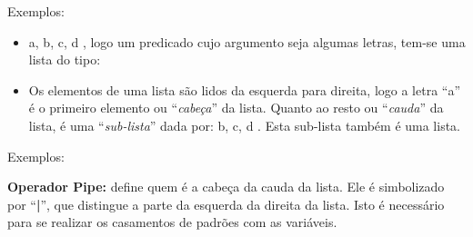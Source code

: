 \documentclass[sans]{beamer}
\begin{document}

\begin{frame}
\begin{block}{Exemplos:}

\begin{itemize}
  \item \lbrack a, b, c, d \rbrack,  logo um predicado cujo
argumento seja algumas letras,  tem-se uma lista do tipo:
\end{itemize}



\begin{itemize}
\item Os elementos de uma lista são lidos da esquerda para direita, logo a letra
``a'' é o primeiro elemento ou ``{\em cabeça}'' da lista. Quanto ao
resto ou ``{\em cauda}'' da lista, é uma   ``{\em sub-lista}''  dada por:
\lbrack b,  c, d \rbrack.  Esta sub-lista também é uma lista.
\end{itemize}
\end{block}   
\end{frame}

\begin{frame}
\begin{block}{Exemplos:}


{\bf Operador Pipe:} define quem é a cabeça da cauda da lista. 
Ele é simbolizado por ``{\bf |}'', que distingue a parte da esquerda da direita da lista. 
Isto é necessário para se realizar os casamentos de padrões com as variáveis.

\end{block}   
\end{frame}

\end{document}
